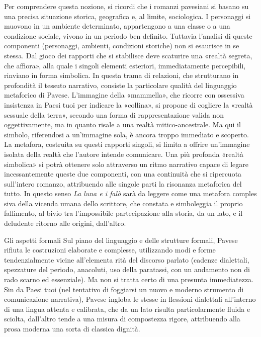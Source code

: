 \documentclass[a4paper, twoside, titlepage]{book}
\begin{document}
Per comprendere questa nozione, si ricordi che i romanzi pavesiani si basano su una precisa situazione storica, geografica e, al limite, sociologica. I personaggi si muovono in un ambiente determinato, appartengono a una classe o a una condizione sociale, vivono in un periodo ben definito. Tuttavia l'analisi di queste componenti (personaggi, ambienti, condizioni storiche) non si esaurisce in se stessa. Dal gioco dei rapporti che si stabilisce deve scaturire una «realtà segreta, che affiora», alla quale i singoli elementi esteriori, immediatamente percepibili, rinviano in forma simbolica. In questa trama di relazioni, che strutturano in profondità il tessuto narrativo, consiste la particolare qualità del linguaggio metaforico di Pavese. L'immagine della «mammella», che ricorre con ossessiva insistenza in Paesi tuoi per indicare la «collina», si propone di cogliere la «realtà sessuale della terra», secondo una forma di rappresentazione valida non oggettivamente, ma in quanto risale a una realtà mitico-ancestrale. Ma qui il simbolo, riferendosi a un'immagine sola, è ancora troppo immediato e scoperto. La metafora, costruita su questi rapporti singoli, si limita a offrire un'immagine isolata della realtà che l'autore intende comunicare. Una più profonda «realtà simbolica» si potrà ottenere solo attraverso un ritmo narrativo capace di legare incessantemente queste due componenti, con una continuità che si ripercuota sull'intero romanzo, attribuendo alle singole parti la risonanza metaforica del tutto. In questo senso \textit{La luna e i falò} sarà da leggere come una metafora comples siva della vicenda umana dello scrittore, che constata e simboleggia il proprio fallimento, al bivio tra l'impossibile partecipazione alla storia, da un lato, e il deludente ritorno alle origini, dall'altro.

Gli aspetti formali Sul piano del linguaggio e delle strutture formali, Pavese rifiuta le costruzioni elaborate e complesse, utilizzando modi e forme tendenzialmente vicine all'elementa rità del discorso parlato (cadenze dialettali, spezzature del periodo, anacoluti, uso della paratassi, con un andamento non di rado scarno ed essenziale). Ma non si tratta certo di una presunta immediatezza. Sin da Paesi tuoi (nel tentativo di foggiarsi un nuovo e moderno strumento di comunicazione narrativa), Pavese ingloba le stesse in flessioni dialettali all'interno di una lingua attenta e calibrata, che da un lato risulta particolarmente fluida e sciolta, dall'altro tende a una misura di compostezza rigore, attribuendo alla prosa moderna una sorta di classica dignità.
\end{document}
